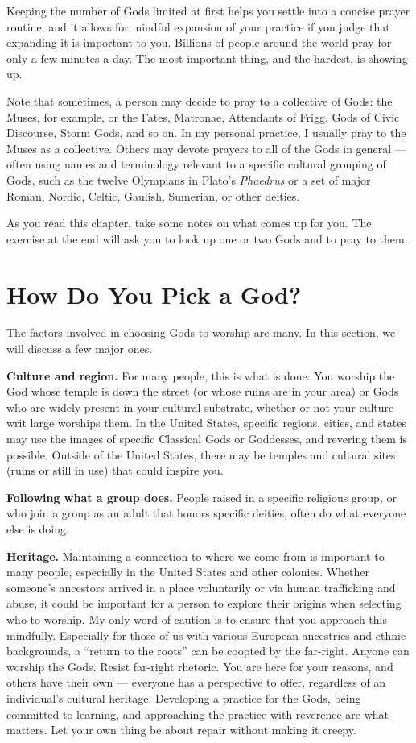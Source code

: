 \documentclass[
]{book}
\begin{document}
Keeping the number of Gods limited at first helps you settle into a concise prayer routine, and it allows for mindful expansion of your practice if you judge that expanding it is important to you. Billions of people around the world pray for only a few minutes a day. The most important thing, and the hardest, is showing up.

Note that sometimes, a person may decide to pray to a collective of Gods: the Muses, for example, or the Fates, Matronae, Attendants of Frigg, Gods of Civic Discourse, Storm Gods, and so on. In my personal practice, I usually pray to the Muses as a collective. Others may devote prayers to all of the Gods in general --- often using names and terminology relevant to a specific cultural grouping of Gods, such as the twelve Olympians in Plato's \emph{Phaedrus} or a set of major Roman, Nordic, Celtic, Gaulish, Sumerian, or other deities.

As you read this chapter, take some notes on what comes up for you. The exercise at the end will ask you to look up one or two Gods and to pray to them.

\hypertarget{how-do-you-pick-a-god}{%
\section{How Do You Pick a God?}\label{how-do-you-pick-a-god}}

The factors involved in choosing Gods to worship are many. In this section, we will discuss a few major ones.

\textbf{Culture and region.} For many people, this is what is done: You worship the God whose temple is down the street (or whose ruins are in your area) or Gods who are widely present in your cultural substrate, whether or not your culture writ large worships them. In the United States, specific regions, cities, and states may use the images of specific Classical Gods or Goddesses, and revering them is possible. Outside of the United States, there may be temples and cultural sites (ruins or still in use) that could inspire you.

\textbf{Following what a group does.} People raised in a specific religious group, or who join a group as an adult that honors specific deities, often do what everyone else is doing.

\textbf{Heritage.} Maintaining a connection to where we come from is important to many people, especially in the United States and other colonies. Whether someone's ancestors arrived in a place voluntarily or via human trafficking and abuse, it could be important for a person to explore their origins when selecting who to worship. My only word of caution is to ensure that you approach this mindfully. Especially for those of us with various European ancestries and ethnic backgrounds, a ``return to the roots'' can be coopted by the far-right. Anyone can worship the Gods. Resist far-right rhetoric. You are here for your reasons, and others have their own --- everyone has a perspective to offer, regardless of an individual's cultural heritage. Developing a practice for the Gods, being committed to learning, and approaching the practice with reverence are what matters. Let your own thing be about repair without making it creepy.
\end{document}
